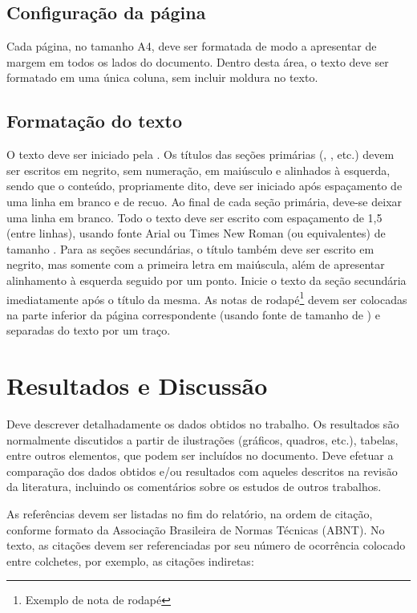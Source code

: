 \documentclass[%
  a4paper,%
  12pt,%
  fleqn,%
  english,%
  brazilian,%
]{article}
\begin{document}
\subsection{Configuração da página}%
\label{ssect:page-config}

Cada página, no tamanho A4, deve ser formatada de modo a apresentar  de margem em todos os lados do documento.
Dentro desta área, o texto deve ser formatado em uma única coluna, sem incluir moldura no texto.

\subsection{Formatação do texto}%
\label{ssect:text-format}

O texto deve ser iniciado pela .
Os títulos das seções primárias (, , etc.) devem ser escritos em negrito, sem numeração, em maiúsculo e alinhados à esquerda, sendo que o conteúdo, propriamente dito, deve ser iniciado após espaçamento de uma linha em branco e  de recuo.
Ao final de cada seção primária, deve-se deixar uma linha em branco.
Todo o texto deve ser escrito com espaçamento de 1,5 (entre linhas), usando fonte Arial ou Times New Roman (ou equivalentes) de tamanho .
Para as seções secundárias, o título também deve ser escrito em negrito, mas somente com a primeira letra em maiúscula, além de apresentar alinhamento à esquerda seguido por um ponto.
Inicie o texto da seção secundária imediatamente após o título da mesma.
As notas de rodapé\footnote{Exemplo de nota de rodapé} devem ser colocadas na parte inferior da página correspondente (usando fonte de tamanho de ) e separadas do texto por um traço.

\section{Resultados e Discussão}%
\label{sect:res-disc}

Deve descrever detalhadamente os dados obtidos no trabalho.
Os resultados são normalmente discutidos a partir de ilustrações (gráficos, quadros, etc.), tabelas, entre outros elementos, que podem ser incluídos no documento.
Deve efetuar a comparação dos dados obtidos e/ou resultados com aqueles descritos na revisão da literatura, incluindo os comentários sobre os estudos de outros trabalhos.

As referências devem ser listadas no fim do relatório, na ordem de citação, conforme formato da Associação Brasileira de Normas Técnicas (ABNT).
No texto, as citações devem ser referenciadas por seu número de ocorrência colocado entre colchetes, por exemplo, as citações indiretas:
\end{document}
